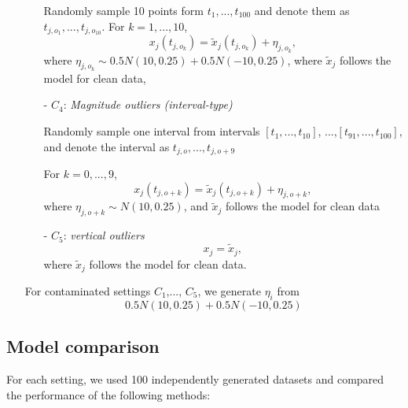 \documentclass{article}
\begin{document}
\begin{itemize}
\begin{itemize}
       \vspace{1ex}
   Randomly sample 10  points form $t_1,..., t_{100}$ and denote them as $t_{j,o_1},..., t_{j,o_{10}}$. For $k = 1,..., 10$,   
    $$x_{j}(t_{j,o_k}) = \tilde{x}_j(t_{j,o_k}) + \eta_{j,o_k},$$ where $\eta_{j,o_k} \sim 0.5 N(10, 0.25) + 0.5 N(-10, 0.25)$, where
 $\tilde{x}_j$ follows the model for clean data,
    \vspace{1ex}
    \item[- ] $C_4$: \textit{Magnitude outliers (interval-type)}

    
       \vspace{1ex}
     Randomly sample one interval from intervals $[t_1,...,t_{10}]$, ...,$[t_{91},...,t_{100}]$,   and denote the interval as $t_{j,o},..., t_{j,o+9}$
     
     For $k = 0,..., 9$,   
    $$x_{j}(t_{j,o + k}) = \tilde{x}_j(t_{j,o + k}) + \eta_{j,o+k},$$ where $\eta_{j,o + k} \sim  N(10, 0.25)$, and 
 $\tilde{x}_j$ follows the model for clean data
    \vspace{1ex}
 
    \item[- ] $C_5$: \textit{vertical outliers} 
       \vspace{1ex}
   $$ x_j = \tilde{x}_j,$$
   where $\tilde{x}_j$ follows the model for clean data. 
\end{itemize}
For contaminated settings $C_1$,..., $C_5$, we generate $\eta_i$ from $$ 0.5N(10,0.25) + 0.5N(-10,0.25)$$
\end{itemize}



\subsection{Model comparison}
For each setting, we used 100 independently generated datasets and compared the performance of the following methods: 
\end{document}
